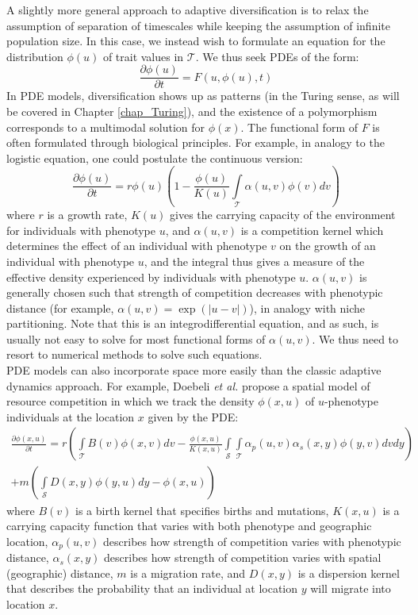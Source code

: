 A slightly more general approach to adaptive diversification is to relax the assumption of separation of timescales while keeping the assumption of infinite population size. In this case, we instead wish to formulate an equation for the distribution $\phi(u)$ of trait values in $\mathcal{T}$. We thus seek PDEs of the form:
\begin{equation*}
	\frac{\partial \phi(u)}{\partial t} = F(u,\phi(u),t)
\end{equation*}
In PDE models, diversification shows up as patterns (in the Turing sense, as will be covered in Chapter \ref{chap_Turing}), and the existence of a polymorphism corresponds to a multimodal solution for $\phi(x)$. The functional form of $F$ is often formulated through biological principles. For example, in analogy to the logistic equation, one could postulate the continuous version:
\begin{equation}
	\label{cts_logistic}
	\frac{\partial \phi(u)}{\partial t} = r\phi(u)\left(1 - \frac{\phi(u)}{K(u)}\int\limits_{\mathcal{T}}\alpha(u,v)\phi(v)dv\right)
\end{equation}
where $r$ is a growth rate, $K(u)$ gives the carrying capacity of the environment for individuals with phenotype $u$, and $\alpha(u,v)$ is a competition kernel which determines the effect of an individual with phenotype $v$ on the growth of an individual with phenotype $u$, and the integral thus gives a measure of the effective density experienced by individuals with phenotype $u$. $\alpha(u,v)$ is generally chosen such that strength of competition decreases with phenotypic distance (for example, $\alpha(u,v) = \exp(|u-v|)$), in analogy with niche partitioning. Note that this is an integrodifferential equation, and as such, is usually not easy to solve for most functional forms of $\alpha(u,v)$. We thus need to resort to numerical methods to solve such equations. \\
PDE models can also incorporate space more easily than the classic adaptive dynamics approach. For example, Doebeli \textit{et al.} propose a spatial model of resource competition in which we track the density $\phi(x,u)$ of $u$-phenotype individuals at the location $x$ given by the PDE:
\begin{equation}
	\begin{split}
		\label{spatial_PDE}
		\frac{\partial \phi(x,u)}{\partial t} = r\left(\int\limits_{\mathcal{T}}B(v)\phi(x,v)dv - \frac{\phi(x,u)}{K(x,u)}\int\limits_{\mathcal{S}}\int\limits_{\mathcal{T}}\alpha_p(u,v)\alpha_s(x,y)\phi(y,v)dvdy\right) \\ +m\left(\int\limits_{\mathcal{S}}D(x,y)\phi(y,u)dy - \phi(x,u)\right)
	\end{split}
\end{equation}
where $B(v)$ is a birth kernel that specifies births and mutations, $K(x,u)$ is a carrying capacity function that varies with both phenotype and geographic location, $\alpha_p(u,v)$ describes how strength of competition varies with phenotypic distance, $\alpha_s(x,y)$ describes how strength of competition varies with spatial (geographic) distance, $m$ is a migration rate, and $D(x,y)$ is a dispersion kernel that describes the probability that an individual at location $y$ will migrate into location $x$.


